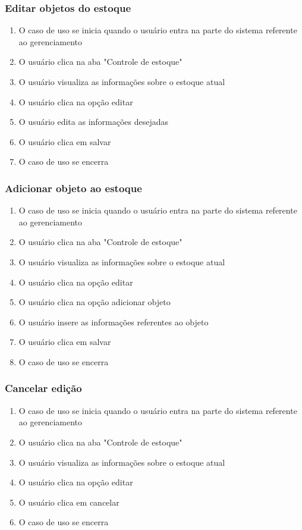 \subsubsection{Editar objetos do estoque}
\begin{enumerate}
	\item O caso de uso se inicia quando o usuário entra na parte do sistema referente ao gerenciamento
	\item O usuário clica na aba "Controle de estoque"
	\item O usuário visualiza as informações sobre o estoque atual
	\item O usuário clica na opção editar
	\item O usuário edita as informações desejadas
	\item O usuário clica em salvar
	\item O caso de uso se encerra
\end{enumerate}

\subsubsection{Adicionar objeto ao estoque}
\begin{enumerate}
	\item O caso de uso se inicia quando o usuário entra na parte do sistema referente ao gerenciamento
	\item O usuário clica na aba "Controle de estoque"
	\item O usuário visualiza as informações sobre o estoque atual
	\item O usuário clica na opção editar
	\item O usuário clica na opção adicionar objeto
	\item O usuário insere as informações referentes ao objeto
	\item O usuário clica em salvar
	\item O caso de uso se encerra
\end{enumerate}

\subsubsection{Cancelar edição}
\begin{enumerate}
	\item O caso de uso se inicia quando o usuário entra na parte do sistema referente ao gerenciamento
	\item O usuário clica na aba "Controle de estoque"
	\item O usuário visualiza as informações sobre o estoque atual
	\item O usuário clica na opção editar
	\item O usuário clica em cancelar
	\item O caso de uso se encerra
\end{enumerate}

